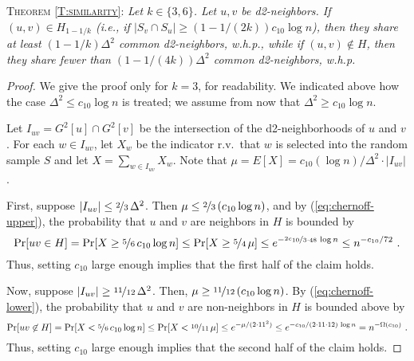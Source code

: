\textsc{Theorem \ref{T:similarity}:} 
\emph{Let $k \in \{3,6\}$.
Let $u,v$ be d2-neighbors. 
If $(u,v) \in H_{1-1/k}$ (i.e., if $|S_v \cap S_u| \ge (1-1/(2k)) c_{10} \log n$), then they share at least $(1-1/k) \Delta^2$ common d2-neighbors, w.h.p.,
while if $(u,v) \not\in H$, then they share fewer than $(1-1/(4k)) \Delta^2$ common d2-neighbors, w.h.p.}
\begin{proof}
We give the proof only for $k=3$, for readability.
We indicated above how the case $\Delta^2 \le c_{10}\log n$ is treated; we assume from now that $\Delta^2 \ge c_{10}\log n$.

Let $I_{uv} = G^2[u]\cap G^2[v]$ be the intersection of the d2-neighborhoods of $u$ and $v$. 
For each $w \in I_{uv}$, let $X_w$ be the indicator r.v.\ that $w$ is
selected into the random sample $S$ and let $X = \sum_{w \in I_{uv}} X_w$. Note that $\mu = E[X] = c_{10} (\log n)/\Delta^2 \cdot |I_{uv}|$.

First, suppose $|I_{uv}| \le \nicefrac{2}{3}\, \Delta^2$.
Then $\mu \le \nicefrac{2}{3}\, (c_{10}\log n)$, and
by (\ref{eq:chernoff-upper}), the probability that $u$ and $v$ are neighbors in $H$ is bounded by
  \[ \Pr[uv \in H] = \Pr[X \ge \nicefrac{5}{6}\, c_{10} \log n]
\le \Pr[X \ge \nicefrac{5}{4}\,\mu] \le e^{-\nicefrac{2c_{10}}{3\cdot 48}\, \log n} \le n^{-c_{10}/72}\ . \]
Thus, setting $c_{10}$ large enough implies that the first half of the claim holds.

Now, suppose $|I_{uv}| \ge \nicefrac{11}{12}\, \Delta^2$.
Then, $\mu \ge \nicefrac{11}{12}\, (c_{10}\log n)$.
By (\ref{eq:chernoff-lower}), the probability that $u$ and $v$ are non-neighbors in $H$ is bounded above by
  \[ \Pr[uv \not\in H] = \Pr[X < \nicefrac{5}{6}\, c_{10} \log n]
\le \Pr[X < \nicefrac{10}{11}\,\mu] \le e^{-\mu/(2\cdot 11^2)} \le e^{-c_{10}/(2\cdot 11 \cdot 12)\, \log n} = n^{-\Omega(c_{10})}\ . \]
Thus, setting $c_{10}$ large enough implies that the second half of the claim holds.
\end{proof}


